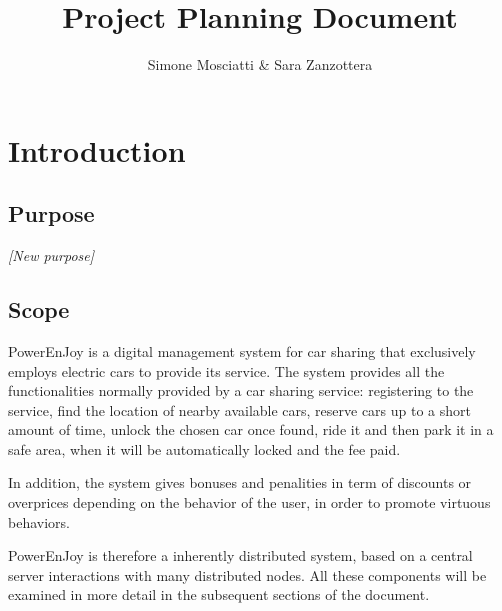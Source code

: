 \documentclass[11pt]{article} %
\title{Project Planning Document}
\author{Simone Mosciatti \& Sara Zanzottera}
\newcommand{\pe}{PowerEnJoy }
\begin{document}
\maketitle
\newpage
\tableofcontents
\newpage


\section{Introduction}

\subsection{Purpose}

\textit{[New purpose]}

\subsection{Scope}

\pe is a digital management system for car sharing that exclusively employs electric cars to provide its service. The system provides all the functionalities normally provided by a car sharing service: registering to the service, find the location of nearby available cars, reserve cars up to a short amount of time, unlock the chosen car once found, ride it and then park it in a safe area, when it will be automatically locked and the fee paid.

In addition, the system gives bonuses and penalities in term of discounts or overprices depending on the behavior of the user, in order to promote virtuous behaviors.

\pe is therefore a inherently distributed system, based on a central server interactions with many distributed nodes. All these components will be examined in more detail in the subsequent sections of the document.
\end{document}
